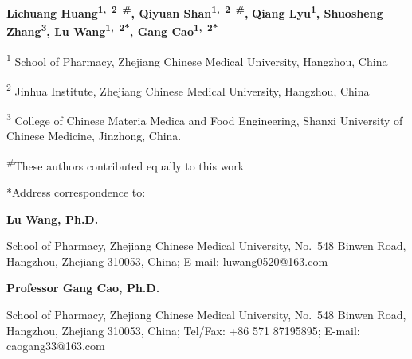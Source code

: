 
\begin{adjustwidth}{2cm}{2cm}
\centering
\textbf{Lichuang Huang\textsuperscript{1,~2~\#}, Qiyuan
Shan\textsuperscript{1,~2~\#},} \textbf{Qiang Lyu\textsuperscript{1},
Shuosheng Zhang\textsuperscript{3}, Lu Wang\textsuperscript{1,~2*}, Gang
Cao\textsuperscript{1,~2*}}

\textsuperscript{1} School of Pharmacy, Zhejiang Chinese Medical
University, Hangzhou, China

\textsuperscript{2} Jinhua Institute, Zhejiang Chinese Medical
University, Hangzhou, China

\textsuperscript{3} College of Chinese Materia Medica and Food
Engineering, Shanxi University of Chinese Medicine, Jinzhong, China.

\textsuperscript{\#}These authors contributed equally to this work

*Address correspondence to:

\textbf{Lu Wang, Ph.D.}

School of Pharmacy, Zhejiang Chinese Medical University, No.~548 Binwen
Road, Hangzhou, Zhejiang 310053, China; E-mail: luwang0520@163.com

\textbf{Professor Gang Cao, Ph.D.}

School of Pharmacy, Zhejiang Chinese Medical University, No.~548 Binwen
Road, Hangzhou, Zhejiang 310053, China; Tel/Fax: +86 571 87195895;
E-mail: caogang33@163.com

\end{adjustwidth}
